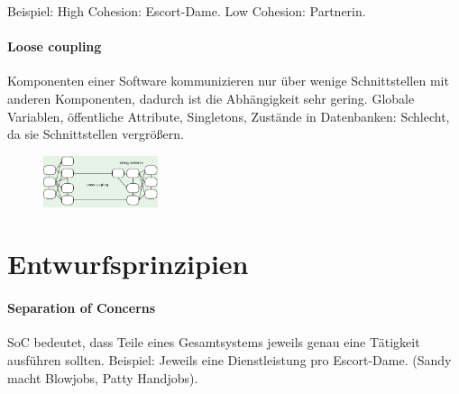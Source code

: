 Beispiel: High Cohesion: Escort-Dame. Low Cohesion: Partnerin.

\paragraph{Loose coupling}\label{loose-coupling}

Komponenten einer Software kommunizieren nur über wenige Schnittstellen
mit anderen Komponenten, dadurch ist die Abhängigkeit sehr gering.
Globale Variablen, öffentliche Attribute, Singletons, Zustände in
Datenbanken: Schlecht, da sie Schnittstellen vergrößern.

\begin{figure} [h]
	\raggedright
	\includegraphics[width=0.3\textwidth]{images/loose_coupling}
\end{figure}

\section{Entwurfsprinzipien}
\paragraph{Separation of Concerns}
SoC bedeutet, dass Teile eines Gesamtsystems jeweils genau eine Tätigkeit
ausführen sollten.
Beispiel: Jeweils eine Dienstleistung pro Escort-Dame. (Sandy macht Blowjobs,
Patty Handjobs).
